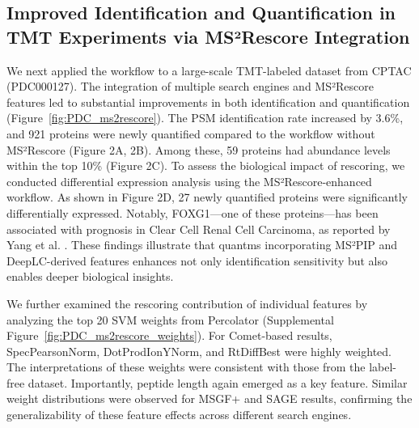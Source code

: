 \documentclass[12pt]{article}
\begin{document}
\subsection{Improved Identification and Quantification in TMT Experiments via MS²Rescore Integration}
We next applied the workflow to a large-scale TMT-labeled dataset from CPTAC (PDC000127). The integration of multiple search engines and MS²Rescore features led to substantial improvements in both identification and quantification (Figure~\ref{fig:PDC_ms2rescore}). The PSM identification rate increased by 3.6\%, and 921 proteins were newly quantified compared to the workflow without MS²Rescore (Figure 2A, 2B). %
Among these, 59 proteins had abundance levels within the top 10\% (Figure 2C). To assess the biological impact of rescoring, we conducted differential expression analysis using the MS²Rescore-enhanced workflow. As shown in Figure 2D, 27 newly quantified proteins were significantly differentially expressed. Notably, FOXG1—one of these proteins—has been associated with prognosis in Clear Cell Renal Cell Carcinoma, as reported by Yang et al. \cite{yang_comprehensive_2022}. These findings illustrate that quantms incorporating MS²PIP and DeepLC-derived features enhances not only identification sensitivity but also enables deeper biological insights.

We further examined the rescoring contribution of individual features by analyzing the top 20 SVM weights from Percolator (Supplemental Figure~\ref{fig:PDC_ms2rescore_weights}). For Comet-based results, SpecPearsonNorm, DotProdIonYNorm, and RtDiffBest were highly weighted. The interpretations of these weights were consistent with those from the label-free dataset. Importantly, peptide length again emerged as a key feature. Similar weight distributions were observed for MSGF+ and SAGE results, confirming the generalizability of these feature effects across different search engines.
\end{document}
